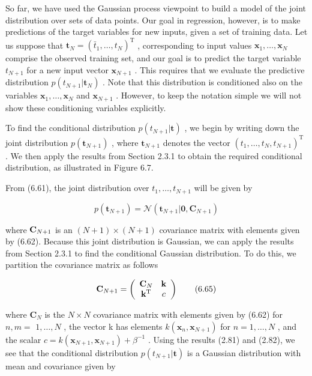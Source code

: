 \documentclass[
  10
]{article}
\begin{document}
So far, we have used the Gaussian process viewpoint to build a model of
the joint distribution over sets of data points. Our goal in regression,
however, is to make predictions of the target variables for new inputs,
given a set of training data. Let us suppose that
\(\mathbf t _ { N } = ( \bar { t } _ { 1 } , \dots , t _ { N } ) ^ { \mathrm T }\)
, corresponding to input values
\(\mathbf { x } _ { 1 } , \ldots , \mathbf { x } _ { N }\) comprise the
observed training set, and our goal is to predict the target variable
\(t _ { N + 1 }\) for a new input vector \(\mathbf { x } _ { N + 1 }\) .
This requires that we evaluate the predictive distribution
\(p ( t _ { N + 1 } | \mathbf { t } _ { N } )\) . Note that this
distribution is conditioned also on the variables
\(\mathbf { x } _ { 1 } , \ldots , \mathbf { x } _ { N }\) and
\(\mathbf { x } _ { N + 1 }\) . However, to keep the notation simple we
will not show these conditioning variables explicitly.

To find the conditional distribution
\(p ( t _ { N + 1 } | \mathbf { t } )\) , we begin by writing down the
joint distribution \(p ( \mathbf { t } _ { N + 1 } )\) , where
\(\mathbf { t } _ { N + 1 }\) denotes the vector
\(( t _ { 1 } , \ldots , t _ { N } , t _ { N + 1 } ) ^ { \mathrm { T } }\)
. We then apply the results from Section 2.3.1 to obtain the required
conditional distribution, as illustrated in Figure 6.7.

From (6.61), the joint distribution over
\(t _ { 1 } , \ldots , t _ { N + 1 }\) will be given by

\[
p (\mathbf {t} _ {N + 1}) = \mathcal {N} (\mathbf {t} _ {N + 1} | \mathbf {0}, \mathbf {C} _ {N + 1})\tag{6.64}
\]

where \({ \bf C } _ { N + 1 }\) is an \(( N + 1 ) \times ( N + 1 )\)
covariance matrix with elements given by (6.62). Because this joint
distribution is Gaussian, we can apply the results from Section 2.3.1 to
find the conditional Gaussian distribution. To do this, we partition the
covariance matrix as follows

\[
\mathbf {C} _ {N + 1} = \left( \begin{array}{c c} \mathbf {C} _ {N} & \mathbf {k} \\ \mathbf {k} ^ {\mathrm{T}} & c \end{array} \right)\tag{6.65}
\]

where \(\mathbf { C } _ { N }\) is the \(N \times N\) covariance matrix
with elements given by (6.62) for \(n , m =\) \(1 , \ldots , N\) , the
vector k has elements
\(k ( \mathbf { x } _ { n } , \mathbf { x } _ { N + 1 } )\) for
\(n = 1 , \ldots , N\) , and the scalar
\(c = k ( \mathbf { x } _ { N + 1 } , \mathbf { x } _ { N + 1 } ) + \beta ^ { - 1 }\)
. Using the results (2.81) and (2.82), we see that the conditional
distribution \(p ( t _ { N + 1 } | \mathbf { t } )\) is a Gaussian
distribution with mean and covariance given by
\end{document}
